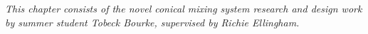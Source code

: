 \chapter{\chapivname}
\label{chapter4}
\textit{This chapter consists of the  novel conical mixing system research and design work by summer student Tobeck Bourke, supervised by Richie Ellingham.}
%
\newpage

\begin{center}

\end{center}
